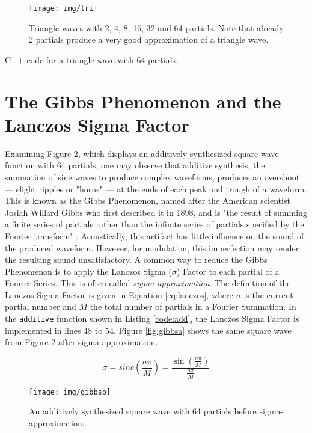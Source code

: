 \begin{figure}
  \texttt{[image: img/tri]}
  \caption{Triangle waves with 2, 4, 8, 16, 32 and 64 partials. Note that already 2 partials produce a very good approximation of a triangle wave.}
  \label{fig:tri}
\end{figure}

\begin{table}
  \caption{C++ code for a triangle wave with 64 partials.}
  \label{code:atri}
\end{table}

\pagebreak

\section{The Gibbs Phenomenon and the Lanczos Sigma Factor}

Examining Figure \ref{fig:gibbsb}, which displays an additively synthesized square wave function with 64 partials, one may observe that additive synthesis, the summation of sine waves to produce complex waveforms, produces an overshoot --- slight ripples or "horns" --- at the ends of each peak and trough of a waveform. This is known as the Gibbs Phenomenon, named after the American scientist Josiah Willard Gibbs who first described it in 1898, and is "the result of summing a finite series of partials rather than the infinite series of partials specified by the Fourier transform" . Acoustically, this artifact has little influence on the sound of the produced waveform. However, for modulation, this imperfection may render the resulting sound unsatisfactory. A common way to reduce the Gibbs Phenomenon is to apply the Lanczos Sigma ($\sigma$) Factor to each partial of a Fourier Series. This is often called \emph{sigma-approximation}. The definition of the Lanczos Sigma Factor is given in Equation \ref{eq:lanczos}, where $n$ is the current partial number and $M$ the total number of partials in a Fourier Summation. In the \texttt{additive} function shown in Listing \ref{code:add}, the Lanczos Sigma Factor is implemented in lines 48 to 54. Figure \ref{fig:gibbsa} shows the same square wave from Figure \ref{fig:gibbsb} after sigma-approximation.

\begin{equation}
  \sigma = sinc(\frac{n\pi}{M}) = \frac{\sin(\frac{n\pi}{M})}{\frac{n\pi}{M}}
  \label{eq:lanczos}
\end{equation}

\begin{figure}[hb!]
  \texttt{[image: img/gibbsb]}
  \caption{An additively synthesized square wave with 64 partials before sigma-approximation.}
  \label{fig:gibbsb}
\end{figure}

